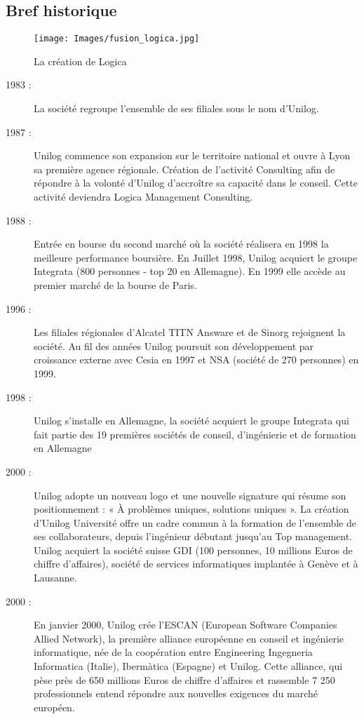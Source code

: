 \subsection{Bref historique}
\begin{figure}[b]
  \begin{center}
    \texttt{[image: Images/fusion\_logica.jpg]}
  \end{center}
  \caption{La création de Logica}
  \label{la création de Logica}
\end{figure}
\clearpage
\begin{description}
\item[1983 :]      La société regroupe l’ensemble de ses filiales sous le nom d’Unilog.

\item[1987 :]     Unilog commence son expansion sur le territoire national et ouvre à Lyon sa première agence régionale. Création de l’activité Consulting afin de répondre à la volonté d’Unilog d’accroître sa capacité dans le conseil. Cette activité deviendra Logica Management Consulting.

\item[1988 :]      Entrée en bourse du second marché où la société réalisera en 1998 la meilleure performance boursière. En Juillet 1998, Unilog acquiert le groupe Integrata (800 personnes - top 20 en Allemagne). En 1999 elle accède au premier marché de la bourse de Paris.

\item[1996 :]      Les filiales régionales d’Alcatel TITN Answare et de Sinorg rejoignent la société. Au fil des années Unilog poursuit son développement par croissance externe avec Cesia en 1997 et NSA (société de 270 personnes) en 1999.

\item[1998 :]     Unilog s’installe en Allemagne, la société acquiert le groupe Integrata qui fait partie des 19 premières sociétés de conseil, d’ingénierie et de formation en Allemagne 

\item[2000 :]     Unilog adopte un nouveau logo et une nouvelle signature qui résume son positionnement : « À problèmes uniques, solutions uniques ». La création d'Unilog Université offre un cadre commun à la formation de l’ensemble de ses collaborateurs, depuis l’ingénieur débutant jusqu’au Top management. Unilog acquiert la société suisse GDI (100 personnes, 10 millions Euros de chiffre d'affaires), société de services informatiques implantée à Genève et à Lausanne. 
\item[2000 :]	  En janvier 2000, Unilog crée l'ESCAN (European Software Companies Allied Network), la première alliance européenne en conseil et ingénierie informatique, née de la coopération entre Engineering Ingegneria Informatica (Italie), Ibermàtica (Espagne) et Unilog. Cette alliance, qui pèse près de 650 millions Euros de chiffre d'affaires et rassemble 7 250 professionnels entend répondre aux nouvelles exigences du marché européen. 


\end{description}
